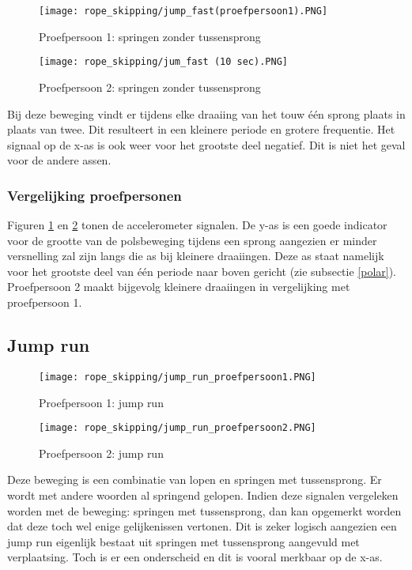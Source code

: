 \begin{figure}[!htpd]
\centering
\caption{Proefpersoon 1: springen zonder tussensprong}\label{fig:jump_fast1}
\texttt{[image: rope\_skipping/jump\_fast(proefpersoon1).PNG]}
\end{figure}

\begin{figure}[!htpd]
\centering
\caption{Proefpersoon 2: springen zonder tussensprong }\label{fig:jump_fast2}
\texttt{[image: rope\_skipping/jum\_fast (10 sec).PNG]}
\end{figure}

Bij deze beweging vindt er tijdens elke draaiing van het touw één sprong plaats in plaats van twee. Dit resulteert in een kleinere periode en grotere frequentie. 
Het signaal op de x-as is ook weer voor het grootste deel negatief. Dit is niet het geval voor de andere assen.

\subsubsection{Vergelijking proefpersonen}
Figuren \ref{fig:jump_fast1} en \ref{fig:jump_fast2} tonen de accelerometer signalen.
De y-as is een goede indicator voor de grootte van de polsbeweging tijdens een sprong aangezien er minder versnelling zal zijn langs die as bij kleinere draaiingen. Deze as staat namelijk voor het grootste deel van één periode naar boven gericht (zie subsectie \ref{polar}). Proefpersoon 2 maakt bijgevolg kleinere draaiingen in vergelijking met proefpersoon 1.

\subsection{Jump run}

\begin{figure}[!htpd]
\centering
\caption{Proefpersoon 1: jump run}\label{fig:jump_run1}
\texttt{[image: rope\_skipping/jump\_run\_proefpersoon1.PNG]}
\end{figure}

\begin{figure}[!htpd]
\centering
\caption{Proefpersoon 2: jump run}\label{fig:jump_run2}
\texttt{[image: rope\_skipping/jump\_run\_proefpersoon2.PNG]}
\end{figure}

Deze beweging is een combinatie van lopen en springen met tussensprong. Er wordt met andere woorden al springend gelopen. Indien deze signalen vergeleken worden met de beweging: springen met tussensprong, dan kan opgemerkt worden dat deze toch wel enige gelijkenissen vertonen. Dit is zeker logisch aangezien een jump run eigenlijk bestaat uit springen met tussensprong aangevuld met verplaatsing. Toch is er een onderscheid en dit is vooral merkbaar op de x-as.

